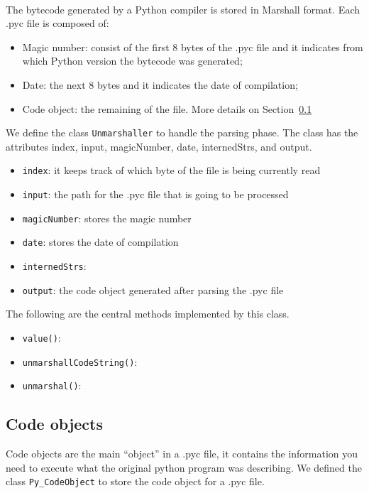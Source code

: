 \documentclass{article}
\begin{document}
\paragraph{}
The bytecode generated by a Python compiler is stored in Marshall format. Each .pyc file is composed of:

\begin{itemize}
	\item Magic number: consist of the first 8 bytes of the .pyc file and it indicates from which Python version the bytecode was generated;
	\item Date: the next 8 bytes and it indicates the date of compilation;
	\item Code object: the remaining of the file. More details on Section~\ref{code object}
\end{itemize}

We define the class \texttt{Unmarshaller} to handle the parsing phase. The class has the attributes index, input, magicNumber, date, internedStrs, and output.

\begin{itemize}
	\item \texttt{index}: it keeps track of which byte of the file is being currently read 
	\item \texttt{input}: the path for the .pyc file that is going to be processed
	\item \texttt{magicNumber}: stores the magic number
	\item \texttt{date}: stores the date of compilation
	\item \texttt{internedStrs}:
	\item \texttt{output}: the code object generated after parsing the .pyc file
\end{itemize}

The following are the central methods implemented by this class.

\begin{itemize}
	\item \texttt{value()}:
	\item \texttt{unmarshallCodeString()}:
	\item \texttt{unmarshal()}:
\end{itemize}

\subsection{Code objects}\label{code object}

Code objects are the main ``object'' in a .pyc file, it contains the information you need to execute what the original python program was describing. We defined the class \texttt{Py\_CodeObject} to store the code object for a .pyc file.
\end{document}
